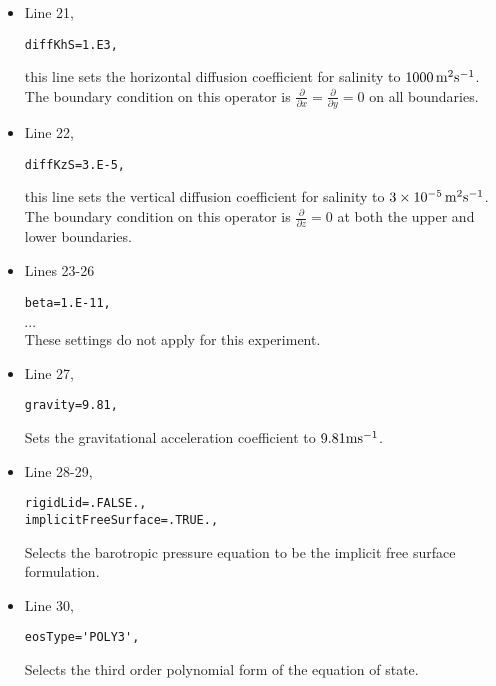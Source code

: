 {\begin{itemize}
\item Line 21,
\begin{verbatim}
diffKhS=1.E3,
\end{verbatim}
this line sets the horizontal diffusion coefficient for salinity
to $1000\,{\rm m^{2}s^{-1}}$. The boundary condition on this
operator is $\frac{\partial}{\partial x}=\frac{\partial}{\partial y}=0$ on
all boundaries.

\item Line 22,
\begin{verbatim}
diffKzS=3.E-5,
\end{verbatim}
this line sets the vertical diffusion coefficient for salinity
to $3 \times 10^{-5}\,{\rm m^{2}s^{-1}}$. The boundary 
condition on this operator is $\frac{\partial}{\partial z}=0$ at both
the upper and lower boundaries.

\item Lines 23-26
\begin{verbatim}
beta=1.E-11,
\end{verbatim}
\vspace{-5mm}$\cdots$\\
These settings do not apply for this experiment.

\item Line 27,
\begin{verbatim}
gravity=9.81,
\end{verbatim}
Sets the gravitational acceleration coefficient to $9.81{\rm m}{\rm s}^{-1}$.\\


\item Line 28-29,
\begin{verbatim}
rigidLid=.FALSE., 
implicitFreeSurface=.TRUE., 
\end{verbatim}
Selects the barotropic pressure equation to be the implicit free surface
formulation.

\item Line 30,
\begin{verbatim}
eosType='POLY3',
\end{verbatim}
Selects the third order polynomial form of the equation of state.\\


\end{itemize}}
